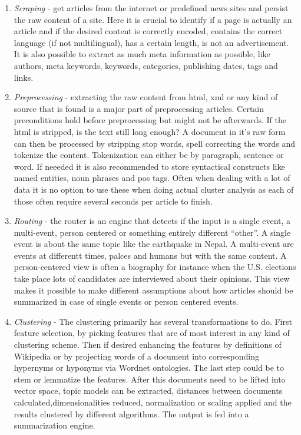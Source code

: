   \begin{enumerate}
    \item \emph{Scraping} - get articles from the internet or predefined news sites and persist the raw content of a site. Here it is crucial to identify if a page is actually an article and if the desired content is correctly encoded, contains the correct language (if not multilingual), has a certain length, is not an advertisement. It is also possible to extract as much meta information as possible, like authors, meta keywords, keywords, categories, publishing dates, tags and links.

    \item \emph{Preprocessing} - extracting the raw content from html, xml or any kind of source that is found is a major part of preprocessing articles. Certain preconditions hold before preprocessing but might not be afterwards. If the html is stripped, is the text still long enough? A document in it's raw form can then be processed by stripping stop words, spell correcting the words and tokenize the content. Tokenization can either be by paragraph, sentence or word. If neeeded it is also recommended to store syntactical constructs like named entities, noun phrases and pos tags. Often when dealing with a lot of data it is no option to use these when doing actual cluster analysis as each of those often require several seconds per article to finish.

    \item \emph{Routing} - the router is an engine that detects if the input is a single event, a multi-event, person centered or something entirely different ``other''. A single event is about the same topic like the earthquake in Nepal. A multi-event are events at differentt times, palces and humans but with the same content. A person-centered view is often a biography for instance when the U.S. elections take place lots of candidates are interviewed about their opinions. This view makes it possible to make different assumptions about how articles should be summarized in case of single events or person centered events.

    \item \emph{Clustering} - The clustering primarily has several transformations to do. First  feature selection, by picking features that are of most interest in any kind of clustering scheme. Then if desired enhancing the features by definitions of Wikipedia or by projecting words of a document into corresponding hypernyms or hyponyms via Wordnet ontologies. The last step could be to stem or lemmatize the features. After this documents need to be lifted into vector space, topic models can be extracted, distances between documents calculated,dimensionalities reduced, normalization or scaling applied and the results clustered by different algorithms. The output is fed into a summarization engine.


\end{enumerate}
